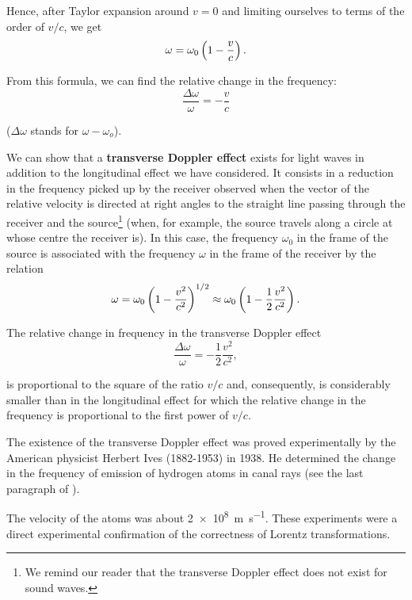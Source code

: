 \noindent
Hence, after Taylor expansion around $v=0$ and limiting ourselves to terms of the order of $v/c$, we get
\begin{equation}\label{eq:21_14}
	\omega = \omega_0 \left(1 - \frac{v}{c}\right).
\end{equation}

\noindent
From this formula, we can find the relative change in the frequency:
\begin{equation}\label{eq:21_15}
	\frac{\Delta{\omega}}{\omega} = - \frac{v}{c}
\end{equation}

\noindent
($\Delta{\omega}$ stands for $\omega-\omega_o$).

We can show that a \textbf{transverse Doppler effect} exists for light waves in addition to the longitudinal effect we have considered.
It consists in a reduction in the frequency picked up by the receiver observed when the vector of the relative velocity is directed at right angles to the straight line passing through the receiver and the source\footnote{We remind our reader that the transverse Doppler effect does not exist for sound waves.} (when, for example, the source travels along a circle at whose centre the receiver is).
In this case, the frequency $\omega_0$ in the frame of the source is associated with the frequency $\omega$ in the frame of the receiver by the relation
\begin{equation}\label{eq:21_16}
	\omega = \omega_0 \left(1 - \frac{v^2}{c^2}\right)^{1/2} \approx \omega_0 \left(1 - \frac{1}{2} \frac{v^2}{c^2}\right).
\end{equation}

The relative change in frequency in the transverse Doppler effect
\begin{equation}\label{eq:21_17}
	\frac{\Delta{\omega}}{\omega} = - \frac{1}{2} \frac{v^2}{c^2},
\end{equation}

\noindent
is proportional to the square of the ratio $v/c$ and, consequently, is considerably smaller than in the longitudinal effect for which the
relative change in the frequency is proportional to the first power of $v/c$.

The existence of the transverse Doppler effect was proved experimentally by the American physicist Herbert Ives (1882-1953) in 1938.
He determined the change in the frequency of emission of hydrogen atoms in canal rays (see the last paragraph of ).

The velocity of the atoms was about \SI{2e8}{m.s^{-1}}.
These experiments were a direct experimental confirmation of the correctness of Lorentz transformations.

